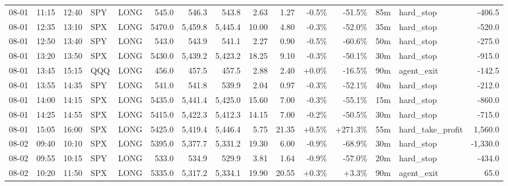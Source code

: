 \documentclass[11pt,a4paper,twoside]{article}
\begin{document}
\begin{landscape}
\begin{center}
\begin{longtable}{>{\color{txtmain}}l l l l l r r r r r r r r >{\color{txtmain}}l r}
08-01 & 11:15 & 12:40 & SPY & LONG & 545.0 & 546.3 & 543.8 & 2.63 & 1.27 & \textcolor{lossred}{-0.5\%} & \textcolor{lossred}{-51.5\%} & 85m & hard\_stop & \textcolor{lossred}{-406.5} \\
08-01 & 12:35 & 13:10 & SPX & LONG & 5470.0 & 5,459.8 & 5,445.4 & 10.00 & 4.80 & \textcolor{lossred}{-0.3\%} & \textcolor{lossred}{-52.0\%} & 35m & hard\_stop & \textcolor{lossred}{-520.0} \\
08-01 & 12:50 & 13:40 & SPY & LONG & 543.0 & 543.9 & 541.1 & 2.27 & 0.90 & \textcolor{lossred}{-0.5\%} & \textcolor{lossred}{-60.6\%} & 50m & hard\_stop & \textcolor{lossred}{-275.0} \\
08-01 & 13:20 & 13:50 & SPX & LONG & 5430.0 & 5,439.2 & 5,423.2 & 18.25 & 9.10 & \textcolor{lossred}{-0.3\%} & \textcolor{lossred}{-50.1\%} & 30m & hard\_stop & \textcolor{lossred}{-915.0} \\
08-01 & 13:45 & 15:15 & QQQ & LONG & 456.0 & 457.5 & 457.5 & 2.88 & 2.40 & \textcolor{wingreen}{+0.0\%} & \textcolor{lossred}{-16.5\%} & 90m & agent\_exit & \textcolor{lossred}{-142.5} \\
08-01 & 13:55 & 14:35 & SPY & LONG & 541.0 & 541.8 & 539.9 & 2.04 & 0.97 & \textcolor{lossred}{-0.3\%} & \textcolor{lossred}{-52.1\%} & 40m & hard\_stop & \textcolor{lossred}{-212.0} \\
08-01 & 14:00 & 14:15 & SPX & LONG & 5435.0 & 5,441.4 & 5,425.0 & 15.60 & 7.00 & \textcolor{lossred}{-0.3\%} & \textcolor{lossred}{-55.1\%} & 15m & hard\_stop & \textcolor{lossred}{-860.0} \\
08-01 & 14:25 & 14:55 & SPX & LONG & 5415.0 & 5,422.3 & 5,412.3 & 14.15 & 7.00 & \textcolor{lossred}{-0.2\%} & \textcolor{lossred}{-50.5\%} & 30m & hard\_stop & \textcolor{lossred}{-715.0} \\
08-01 & 15:05 & 16:00 & SPX & LONG & 5425.0 & 5,419.4 & 5,446.4 & 5.75 & 21.35 & \textcolor{wingreen}{+0.5\%} & \textcolor{wingreen}{+271.3\%} & 55m & hard\_take\_profit & \textcolor{wingreen}{1,560.0} \\
08-02 & 09:40 & 10:10 & SPX & LONG & 5395.0 & 5,377.7 & 5,331.2 & 19.30 & 6.00 & \textcolor{lossred}{-0.9\%} & \textcolor{lossred}{-68.9\%} & 30m & hard\_stop & \textcolor{lossred}{-1,330.0} \\
08-02 & 09:55 & 10:15 & SPY & LONG & 533.0 & 534.9 & 529.9 & 3.81 & 1.64 & \textcolor{lossred}{-0.9\%} & \textcolor{lossred}{-57.0\%} & 20m & hard\_stop & \textcolor{lossred}{-434.0} \\
08-02 & 10:20 & 11:50 & SPX & LONG & 5335.0 & 5,317.2 & 5,334.1 & 19.90 & 20.55 & \textcolor{wingreen}{+0.3\%} & \textcolor{wingreen}{+3.3\%} & 90m & agent\_exit & \textcolor{wingreen}{65.0} \\

\end{longtable}
\end{center}
\end{landscape}
\end{document}

